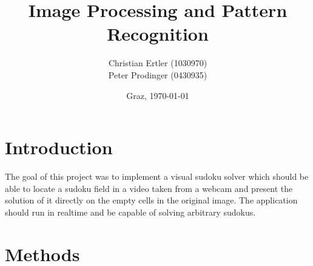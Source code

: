 \documentclass[
a4paper,     %
12pt         %
]{scrartcl}  %
\title{Image Processing and Pattern Recognition}
\author{Christian Ertler (1030970) \\ Peter Prodinger (0430935)}
\date{Graz, \today{}}
\begin{document}
\maketitle









\section{Introduction}

The goal of this project was to implement a visual sudoku solver which should be able
to locate a sudoku field in a video taken from a webcam and present the solution of it
directly on the empty cells in the original image. The application should run in realtime
and be capable of solving arbitrary sudokus. 

\section{Methods}
\end{document}
